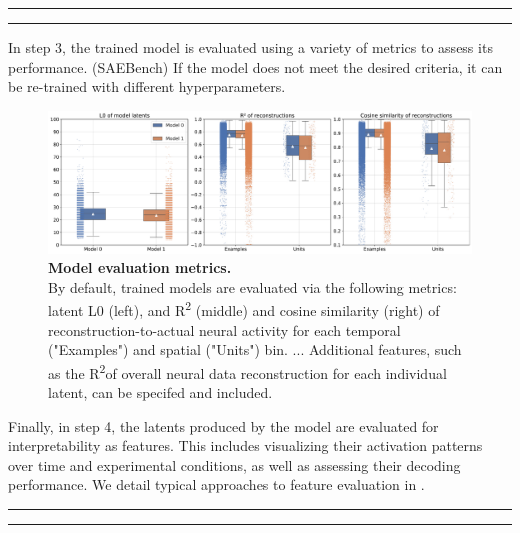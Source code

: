\hrule
\hrule

In step 3, the trained model is evaluated using a variety of metrics to assess its performance. (SAEBench) If the model does not meet the desired criteria, it can be re-trained with different hyperparameters. 

\begin{figure}[h]
    \centering
    \includegraphics[width=\linewidth]{figures/model_eval.pdf}
    \caption{
        \textbf{Model evaluation metrics.} \\
        \small By default, trained models are evaluated via the following metrics: latent L0 (left), and R\textsuperscript{2} (middle) and cosine similarity (right) of reconstruction-to-actual neural activity for each temporal ("Examples") and spatial ("Units") bin. ... Additional features, such as the R\textsuperscript{2}of overall neural data reconstruction for each individual latent, can be specifed and included.
    }
    \label{fig:model_eval}
\end{figure}

Finally, in step 4, the latents produced by the model are evaluated for interpretability as features. This includes visualizing their activation patterns over time and experimental conditions, as well as assessing their decoding performance. We detail typical approaches to feature evaluation in .

\hrule
\hrule

